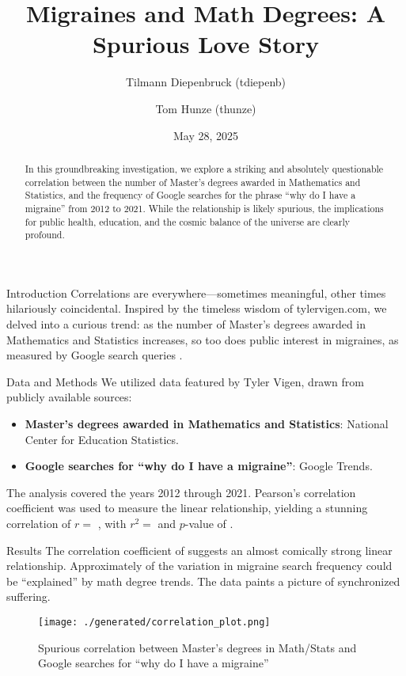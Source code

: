 \documentclass{article}
\title{\textbf{Migraines and Math Degrees: A Spurious Love Story}}
\author{Tilmann Diepenbruck (tdiepenb) \and Tom Hunze (thunze)}
\date{May 28, 2025}
\begin{document}
\maketitle

\begin{abstract}
  In this groundbreaking investigation, we explore a striking and absolutely questionable correlation between the number of Master's degrees awarded in Mathematics and Statistics, and the frequency of Google searches for the phrase ``why do I have a migraine'' from 2012 to 2021. While the relationship is likely spurious, the implications for public health, education, and the cosmic balance of the universe are clearly profound.
\end{abstract}

\begin{section}{Introduction}
 Correlations are everywhere---sometimes meaningful, other times hilariously coincidental. Inspired by the timeless wisdom of tylervigen.com, we delved into a curious trend: as the number of Master's degrees awarded in Mathematics and Statistics increases, so too does public interest in migraines, as measured by Google search queries \cite{vigen}.
\end{section}

\begin{section}{Data and Methods}
 We utilized data featured by Tyler Vigen, drawn from publicly available sources:
 \begin{itemize}
   \item \textbf{Master's degrees awarded in Mathematics and Statistics}: National Center for Education Statistics. \cite{nc_es}
   \item \textbf{Google searches for ``why do I have a migraine''}: Google Trends. \cite{google_trends}
 \end{itemize}
 The analysis covered the years 2012 through 2021. Pearson's correlation coefficient was used to measure the linear relationship, yielding a stunning correlation of $r =$ , with $r^2 =$  and $p$-value of .
\end{section}

\begin{section}{Results}
 The correlation coefficient of  suggests an almost comically strong linear relationship. Approximately  of the variation in migraine search frequency could be ``explained'' by math degree trends. The data paints a picture of synchronized suffering.

 \begin{figure}[H]
   \centering
   \texttt{[image: ./generated/correlation\_plot.png]}
   \caption{Spurious correlation between Master's degrees in Math/Stats and Google searches for ``why do I have a migraine''}
   \label{fig:correlation}
 \end{figure}

\end{section}
\end{document}
